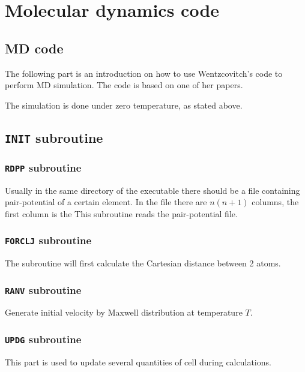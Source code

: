 
\section{Molecular dynamics code}

\subsection{MD code}

The following part is an introduction on how to use
Wentzcovitch's code to perform MD simulation. The code is
based on one of her papers.\cite{Wentzcovitch:1991ka}

The simulation is done under zero temperature, as stated above.


\subsection{\texttt{INIT} subroutine}


\subsubsection{\texttt{RDPP} subroutine}

Usually in the same directory of the executable there should be
a file containing pair-potential of a certain element. In the file there
are $n (n+1)$ columns, the first column is the
This subroutine reads the pair-potential file.


\subsubsection{\texttt{FORCLJ} subroutine}

The subroutine will first calculate the Cartesian distance between 2 atoms.



\subsubsection{\texttt{RANV} subroutine}

Generate initial velocity by Maxwell distribution at temperature $T$.


\subsubsection{\texttt{UPDG} subroutine}

This part is used to update several quantities of cell during calculations.

